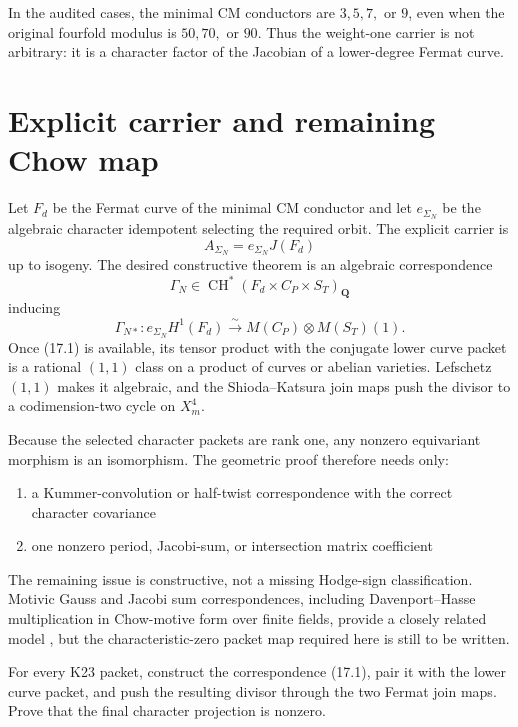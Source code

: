 \documentclass[11pt,oneside]{book}
\theoremstyle{definition}
\theoremstyle{remark}
\newcommand{\CH}{\operatorname{CH}}
\newcommand{\Q}{\mathbf{Q}}
\begin{document}
\begin{center}

\end{center}

In the audited cases, the minimal CM conductors are \(3,5,7,\) or \(9\), even when the original fourfold modulus is \(50,70,\) or \(90\). Thus the weight-one carrier is not arbitrary: it is a character factor of the Jacobian of a lower-degree Fermat curve.

\chapter{Explicit carrier and remaining Chow map}
Let \(F_d\) be the Fermat curve of the minimal CM conductor and let \(e_{\Sigma_N}\) be the algebraic character idempotent selecting the required orbit. The explicit carrier is
\[
A_{\Sigma_N}=e_{\Sigma_N}J(F_d)
\]
up to isogeny. The desired constructive theorem is an algebraic correspondence
\[
\Gamma_N\in
\CH^\ast(F_d\times C_P\times S_T)_\Q
\]
inducing
\[
\boxed{
\Gamma_{N*}:
 e_{\Sigma_N}H^1(F_d)
 \xrightarrow{\sim}
 M(C_P)\otimes M(S_T)(1).
}
\tag{17.1}
\]
Once (17.1) is available, its tensor product with the conjugate lower curve packet is a rational \((1,1)\) class on a product of curves or abelian varieties. Lefschetz \((1,1)\) makes it algebraic, and the Shioda--Katsura join maps push the divisor to a codimension-two cycle on \(X_m^4\).

Because the selected character packets are rank one, any nonzero equivariant morphism is an isomorphism. The geometric proof therefore needs only:
\begin{enumerate}
\item a Kummer-convolution or half-twist correspondence with the correct character covariance
\item one nonzero period, Jacobi-sum, or intersection matrix coefficient
\end{enumerate}
The remaining issue is constructive, not a missing Hodge-sign classification. Motivic Gauss and Jacobi sum correspondences, including Davenport--Hasse multiplication in Chow-motive form over finite fields, provide a closely related model \cite{OtsuboYamazaki}, but the characteristic-zero packet map required here is still to be written.

\begin{openproblem}
For every K23 packet, construct the correspondence (17.1), pair it with the lower curve packet, and push the resulting divisor through the two Fermat join maps. Prove that the final character projection is nonzero.
\end{openproblem}
\end{document}
